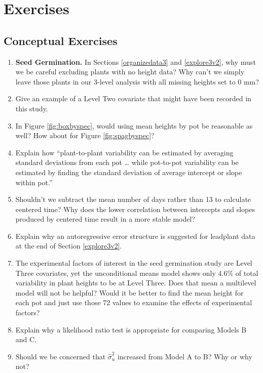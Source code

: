 \documentclass[
]{krantz}
\begin{document}
\hypertarget{exercises-2}{%
\section{Exercises}\label{exercises-2}}

\hypertarget{conceptual-exercises-2}{%
\subsection{Conceptual Exercises}\label{conceptual-exercises-2}}

\begin{enumerate}
\def\labelenumi{\arabic{enumi}.}
\item
  \textbf{Seed Germination.} In Sections \ref{organizedata3} and \ref{explore3v2}, why must we be careful excluding plants with no height data? Why can't we simply leave those plants in our 3-level analysis with all missing heights set to 0 mm?
\item
  Give an example of a Level Two covariate that might have been recorded in this study.
\item
  In Figure \ref{fig:boxbyspec}, would using mean heights by pot be reasonable as well? How about for Figure \ref{fig:spagbyspec}?
\item
  Explain how ``plant-to-plant variability can be estimated by averaging standard deviations from each pot \ldots{} while pot-to-pot variability can be estimated by finding the standard deviation of average intercept or slope within pot.''
\item
  Shouldn't we subtract the mean number of days rather than 13 to calculate centered time? Why does the lower correlation between intercepts and slopes produced by centered time result in a more stable model?
\item
  Explain why an autoregressive error structure is suggested for leadplant data at the end of Section \ref{explore3v2}.
\item
  The experimental factors of interest in the seed germination study are Level Three covariates, yet the unconditional means model shows only 4.6\% of total variability in plant heights to be at Level Three. Does that mean a multilevel model will not be helpful? Would it be better to find the mean height for each pot and just use those 72 values to examine the effects of experimental factors?
\item
  Explain why a likelihood ratio test is appropriate for comparing Models B and C.
\item
  Should we be concerned that \(\hat{\sigma}_{u}^{2}\) increased from Model A to B? Why or why not?

\end{enumerate}
\end{document}
